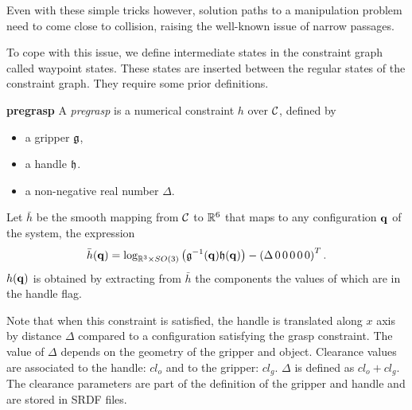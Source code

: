 Even with these simple tricks however, solution paths to a manipulation problem need to come close to collision, raising the well-known issue of narrow passages.

To cope with this issue, we define intermediate states in the
constraint graph called waypoint states. These states are inserted
between the regular states of the constraint graph. They require some prior
definitions.

\begin{definition}\label{def:pregrasp}\textbf{pregrasp}
  A \emph{pregrasp} is a numerical constraint $h$ over $\mathcal{C}$, defined by
  \begin{itemize}
  \item a gripper $\mathfrak{g}$,
  \item a handle $\mathfrak{h}$.
  \item a non-negative real number $\Delta$.
  \end{itemize}
  Let $\bar{h}$ be the smooth mapping from $\mathcal{C}$ to $\mathbb{R}^6$ that maps to any configuration $\mathbf{q}$ of the system, the expression
  \begin{equation}\label{eq:barh-pregrasp}
    \bar{h}(\conf) = \log_{\reals^3\times SO(3)}\left(\gripper^{-1}(\conf) \handle(\conf)\right) - \left(\Delta\, 0\, 0\, 0\, 0\, 0\right)^T.
  \end{equation}
  $h(\mathbf{q})$ is obtained by extracting from $\bar{h}$ the components the values of which are \true in the handle flag.
\end{definition}
Note that when this constraint is satisfied, the handle is translated
along $x$ axis by distance $\Delta$ compared to a configuration
satisfying the grasp constraint. The value of $\Delta$ depends on the geometry
of the gripper and object. Clearance values are associated to the handle: $cl_{o}$ and to the gripper: $cl_{g}$. $\Delta$ is defined as $cl_{o}+cl_{g}$. The
clearance parameters are part of the definition of the gripper and handle and
are stored in SRDF files.

